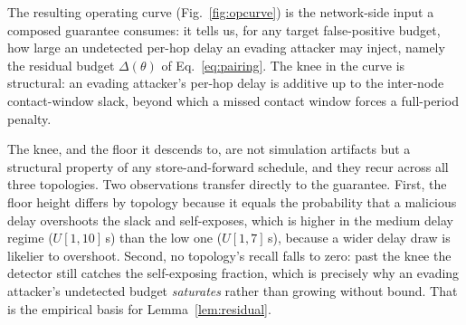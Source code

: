 The resulting operating curve (Fig.~\ref{fig:opcurve}) is the network-side input
a composed guarantee consumes: it tells us, for any target false-positive
budget, how large an undetected per-hop delay an evading attacker may
inject, namely the residual budget $\Delta(\theta)$ of Eq.~\eqref{eq:pairing}. The knee in
the curve is structural: an evading attacker's per-hop delay is additive up to
the inter-node contact-window slack, beyond which a missed contact window forces
a full-period penalty.

The knee, and the floor it descends to, are not simulation artifacts but a
structural property of any store-and-forward schedule, and they recur across all
three topologies. Two observations transfer directly to the guarantee. First,
the floor height differs by topology because it equals the probability that a
malicious delay overshoots the slack and self-exposes, which is higher in the medium
delay regime ($U[1,10]$\,s) than the low one ($U[1,7]$\,s), because a wider
delay draw is likelier to overshoot. Second, no topology's recall falls to zero:
past the knee the detector still catches the self-exposing fraction, which is
precisely why an evading attacker's undetected budget \emph{saturates} rather
than growing without bound. That is the empirical basis for
Lemma~\ref{lem:residual}.

